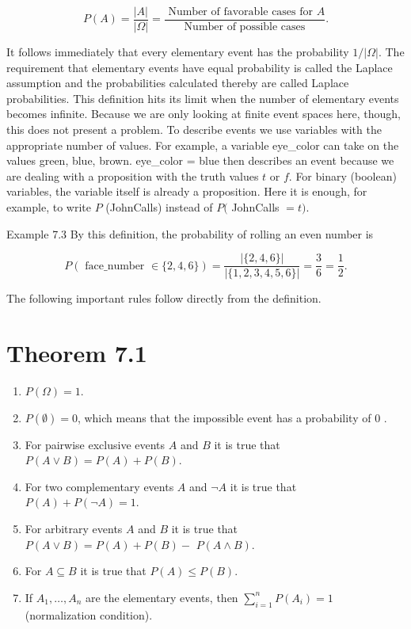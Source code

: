 \documentclass[10pt]{article}
\begin{document}
$$
P(A)=\frac{|A|}{|\Omega|}=\frac{\text { Number of favorable cases for } A}{\text { Number of possible cases }} .
$$

It follows immediately that every elementary event has the probability $1 /|\Omega|$. The requirement that elementary events have equal probability is called the Laplace assumption and the probabilities calculated thereby are called Laplace probabilities. This definition hits its limit when the number of elementary events becomes infinite. Because we are only looking at finite event spaces here, though, this does not present a problem. To describe events we use variables with the appropriate number of values. For example, a variable eye\_color can take on the values green, blue, brown. eye\_color = blue then describes an event because we are dealing with a proposition with the truth values $t$ or $f$. For binary (boolean) variables, the variable itself is already a proposition. Here it is enough, for example, to write $P$ (JohnCalls) instead of $P($ JohnCalls $=t)$.

Example 7.3 By this definition, the probability of rolling an even number is

$$
P(\text { face_number } \in\{2,4,6\})=\frac{|\{2,4,6\}|}{|\{1,2,3,4,5,6\}|}=\frac{3}{6}=\frac{1}{2} .
$$

The following important rules follow directly from the definition.

\section*{Theorem 7.1}
\begin{enumerate}
  \item $P(\Omega)=1$.
  \item $P(\emptyset)=0$, which means that the impossible event has a probability of 0 .
  \item For pairwise exclusive events $A$ and $B$ it is true that $P(A \vee B)=P(A)+P(B)$.
  \item For two complementary events $A$ and $\neg A$ it is true that $P(A)+P(\neg A)=1$.
  \item For arbitrary events $A$ and $B$ it is true that $P(A \vee B)=P(A)+P(B)-$ $P(A \wedge B)$.
  \item For $A \subseteq B$ it is true that $P(A) \leq P(B)$.
  \item If $A_{1}, \ldots, A_{n}$ are the elementary events, then $\sum_{i=1}^{n} P\left(A_{i}\right)=1$ (normalization condition).
\end{enumerate}
\end{document}
